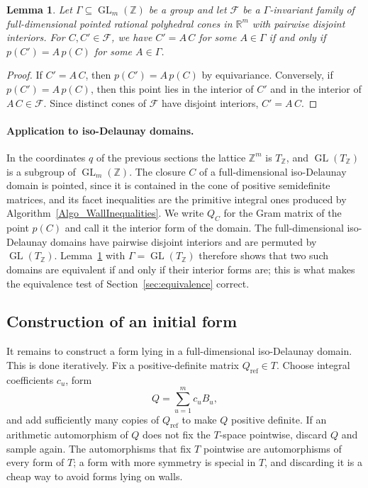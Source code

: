 \documentclass{amsart}
\newtheorem{lemma}{Lemma}
\newcommand{\GL}{\operatorname{GL}}
\newcommand{\ZZ}{\mathbb{Z}}
\newcommand{\RR}{\mathbb{R}}
\begin{document}
\begin{lemma}\label{lem:canonical_equivalence}
Let \(\Gamma\subseteq\GL_m(\ZZ)\) be a group and let \(\mathcal{F}\) be a
\(\Gamma\)-invariant family of full-dimensional pointed rational polyhedral
cones in \(\RR^m\) with pairwise disjoint interiors.  For \(C,C'\in
\mathcal{F}\), we have \(C'=A\,C\) for some \(A\in\Gamma\) if and only if
\(p(C')=A\,p(C)\) for some \(A\in\Gamma\).
\end{lemma}

\begin{proof}
If \(C'=A\,C\), then \(p(C')=A\,p(C)\) by equivariance.  Conversely, if
\(p(C')=A\,p(C)\), then this point lies in the interior of \(C'\) and in the
interior of \(A\,C\in\mathcal{F}\).  Since distinct cones of \(\mathcal{F}\)
have disjoint interiors, \(C'=A\,C\).
\end{proof}

\paragraph{Application to iso-Delaunay domains.}
In the coordinates \(q\) of the previous sections the lattice \(\ZZ^m\) is
\(T_{\ZZ}\), and \(\GL(T_{\ZZ})\) is a subgroup of \(\GL_m(\ZZ)\).  The closure
\(C\) of a full-dimensional iso-Delaunay domain is pointed, since it is
contained in the cone of positive semidefinite matrices, and its facet
inequalities are the primitive integral ones produced by
Algorithm~\ref{Algo_WallInequalities}.  We write \(Q_C\) for the Gram matrix
of the point \(p(C)\) and call it the interior form of the domain.  The
full-dimensional iso-Delaunay domains have pairwise disjoint interiors and are
permuted by \(\GL(T_{\ZZ})\).  Lemma~\ref{lem:canonical_equivalence} with
\(\Gamma=\GL(T_{\ZZ})\) therefore shows that two such domains are equivalent
if and only if their interior forms are; this is what makes the equivalence
test of Section~\ref{sec:equivalence} correct.

\subsection{Construction of an initial form}\label{sec:initial}

It remains to construct a form lying in a full-dimensional iso-Delaunay
domain.  This is done iteratively.  Fix a positive-definite matrix
\(Q_{\mathrm{ref}}\in T\).  Choose integral coefficients \(c_u\), form
\begin{equation}
  Q=\sum_{u=1}^{m}c_uB_u,
\end{equation}
and add sufficiently many copies of \(Q_{\mathrm{ref}}\) to make
\(Q\) positive definite.  If an arithmetic automorphism of \(Q\) does not fix
the \(T\)-space pointwise, discard \(Q\) and sample again.  The automorphisms
that fix \(T\) pointwise are automorphisms of every form of \(T\); a form with
more symmetry is special in \(T\), and discarding it is a cheap way to avoid
forms lying on walls.
\end{document}
